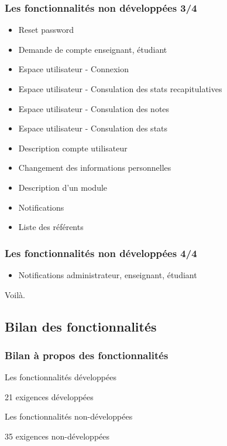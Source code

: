 \documentclass{beamer}
\begin{document}
      \begin{frame}
        \frametitle{Les fonctionnalités non développées 3/4}
        \begin{block}{}
          \begin{itemize}
            \item Reset password
            \item Demande de compte enseignant, étudiant
            \item Espace utilisateur - Connexion
            \item Espace utilisateur - Consulation des stats recapitulatives
            \item Espace utilisateur - Consulation des notes
            \item Espace utilisateur - Consulation des stats
            \item Description compte utilisateur
            \item Changement des informations personnelles
            \item Description d'un module
            \item Notifications
            \item Liste des référents
          \end{itemize}
        \end{block}
      \end{frame}
      \begin{frame}
        \frametitle{Les fonctionnalités non développées 4/4}
        \begin{block}{}
          \begin{itemize}
            \item Notifications administrateur, enseignant, étudiant
          \end{itemize}
          \begin{center}
            Voilà.
          \end{center}
        \end{block}
      \end{frame}

    \subsection{Bilan des fonctionnalités}
    \begin{frame}
      \frametitle{Bilan à propos des fonctionnalités}
      \begin{block}{Les fonctionnalités développées}
        \begin{center}
          21 exigences développées
        \end{center}
      \end{block}
      \begin{block}{Les fonctionnalités non-développées}
        \begin{center}
          35 exigences non-développées
        \end{center}
      \end{block}
    \end{frame}
\end{document}
